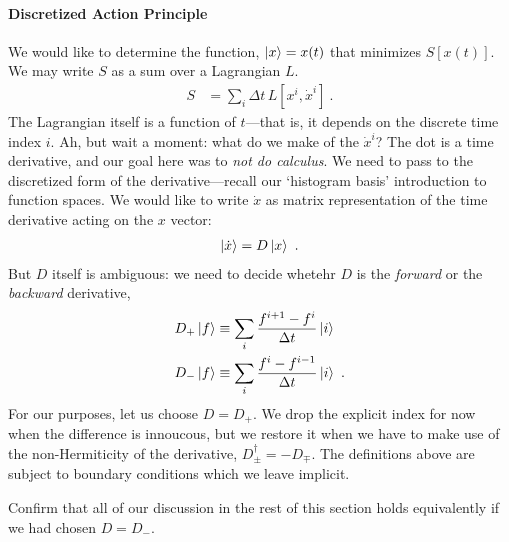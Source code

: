 \paragraph{Discretized Action Principle}
We would like to determine the function, $\left|x\right\rangle=x(t)$ that minimizes $S[x(t)]$. We may write $S$ as a sum over a Lagrangian $L$. 
\begin{align}
    S &= \sum_i \Delta t \, L[x^i, \dot x^i]  \ .
\end{align}
The Lagrangian itself is a function of $t$---that is, it depends on the discrete time index $i$.
Ah, but wait a moment: what do we make of the $\dot x^i$? The dot is a time derivative, and our goal here was to \emph{not do calculus}. We need to pass to the discretized form of the derivative---recall our `histogram basis' introduction to function spaces. We would like to write $\dot x$ as matrix representation of the time derivative acting on the $x$ vector:
\begin{align}
    \left|\dot{x}\right\rangle = D\left|x\right\rangle \ .
\end{align}
But $D$ itself is ambiguous: we need to decide whetehr $D$ is the \emph{forward} or the \emph{backward} derivative,
\begin{align}
    D_+ \left|f\right\rangle 
    &\equiv \sum_i \frac{ f^{i+1} - f^i }{\Delta t} \left|i\right\rangle
    \\
    D_- \left|f\right\rangle 
    &\equiv \sum_i \frac{ f^{i} - f^{i-1} }{\Delta t} \left|i\right\rangle \ .
\end{align}
For our purposes, let us choose $D=D_+$. We drop the explicit index for now when the difference is innoucous, but we restore it when we have to make use of the non-Hermiticity of the derivative, $D_\pm^\dag = - D_\mp$. The definitions above are subject to boundary conditions which we leave implicit. 
\begin{exercise}
Confirm that all of our discussion in the rest of this section holds equivalently if we had chosen $D=D_-$.
\end{exercise}

